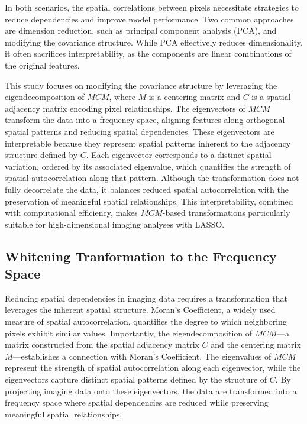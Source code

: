 \documentclass[12pt]{article}
\begin{document}
In both scenarios, the spatial correlations between pixels necessitate strategies to reduce dependencies and improve model performance. Two common approaches are dimension reduction, such as principal component analysis (PCA), and modifying the covariance structure. While PCA effectively reduces dimensionality, it often sacrifices interpretability, as the components are linear combinations of the original features.

This study focuses on modifying the covariance structure by leveraging the eigendecomposition of \( MCM \), where \( M \) is a centering matrix and \( C \) is a spatial adjacency matrix encoding pixel relationships. The eigenvectors of \( MCM \) transform the data into a frequency space, aligning features along orthogonal spatial patterns and reducing spatial dependencies. These eigenvectors are interpretable because they represent spatial patterns inherent to the adjacency structure defined by \( C \). Each eigenvector corresponds to a distinct spatial variation, ordered by its associated eigenvalue, which quantifies the strength of spatial autocorrelation along that pattern. Although the transformation does not fully decorrelate the data, it balances reduced spatial autocorrelation with the preservation of meaningful spatial relationships. This interpretability, combined with computational efficiency, makes \( MCM \)-based transformations particularly suitable for high-dimensional imaging analyses with LASSO.



\subsection{Whitening Tranformation to the Frequency Space}

Reducing spatial dependencies in imaging data requires a transformation that leverages the inherent spatial structure. Moran's Coefficient, a widely used measure of spatial autocorrelation, quantifies the degree to which neighboring pixels exhibit similar values. Importantly, the eigendecomposition of \( MCM \)—a matrix constructed from the spatial adjacency matrix \( C \) and the centering matrix \( M \)—establishes a connection with Moran's Coefficient. The eigenvalues of \( MCM \) represent the strength of spatial autocorrelation along each eigenvector, while the eigenvectors capture distinct spatial patterns defined by the structure of \( C \). By projecting imaging data onto these eigenvectors, the data are transformed into a frequency space where spatial dependencies are reduced while preserving meaningful spatial relationships.
\end{document}
